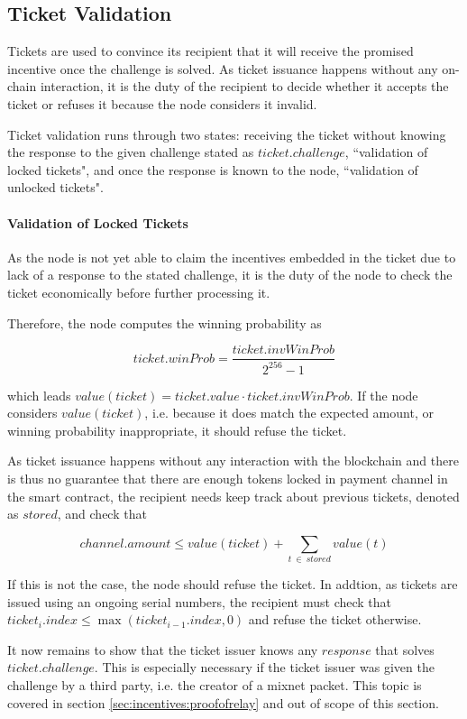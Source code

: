 \subsection{Ticket Validation}
\label{sec:tickets:validation}

Tickets are used to convince its recipient that it will receive the promised incentive once the challenge is solved. As ticket issuance happens without any on-chain interaction, it is the duty of the recipient to decide whether it accepts the ticket or refuses it because the node considers it invalid.

Ticket validation runs through two states: receiving the ticket without knowing the response to the given challenge stated as $ticket.challenge$, ``validation of locked tickets", and once the response is known to the node, ``validation of unlocked tickets".

\paragraph{Validation of Locked Tickets} As the node is not yet able to claim the incentives embedded in the ticket due to lack of a response to the stated challenge, it is the duty of the node to check the ticket economically before further processing it.

Therefore, the node computes the winning probability as

$$ticket.winProb = \frac{ticket.invWinProb}{2^{256} - 1} $$

which leads $ value(ticket) = ticket.value \cdot ticket.invWinProb $. If the node considers $value(ticket)$, i.e. because it does match the expected amount, or winning probability inappropriate, it should refuse the ticket.

As ticket issuance happens without any interaction with the blockchain and there is thus no guarantee that there are enough tokens locked in payment channel in the smart contract, the recipient needs keep track about previous tickets, denoted as $stored$, and check that

$$ channel.amount \le value(ticket) + \sum_{t \ \in \ stored} value(t)$$

If this is not the case, the node should refuse the ticket. In addtion, as tickets are issued using an ongoing serial numbers, the recipient must check that $ticket_i.index \le \max(ticket_{i-1}.index,0)$ and refuse the ticket otherwise.

It now remains to show that the ticket issuer knows any $response$ that solves $ticket.challenge$. This is especially necessary if the ticket issuer was given the challenge by a third party, i.e. the creator of a mixnet packet. This topic is covered in section \ref{sec:incentives:proofofrelay} and out of scope of this section.

